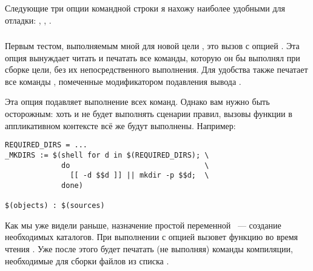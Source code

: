 Следующие три опции командной строки я нахожу наиболее удобными для
отладки: , , .

\subsubsection{}

Первым тестом, выполняемым мной для новой цели , это вызов
\GNUmake{} с опцией . Эта опция вынуждает
\GNUmake{} читать \Makefile{} и печатать все команды, которую он бы
выполнял при сборке цели, без их непосредственного выполнения. Для
удобства \GNUmake{} также печатает все команды ,
помеченные модификатором подавления вывода .

Эта опция подавляет выполнение всех команд. Однако вам нужно быть
осторожным: хоть \GNUmake{} и не будет выполнять сценарии правил,
вызовы функции  в аппликативном контексте всё же будут
выполнены. Например:

\begin{verbatim}
REQUIRED_DIRS = ...
_MKDIRS := $(shell for d in $(REQUIRED_DIRS); \
             do                               \
               [[ -d $$d ]] || mkdir -p $$d;  \
             done)

$(objects) : $(sources)
\end{verbatim}

Как мы уже видели раньше, назначение простой переменной
~--- создание необходимых каталогов. При выполнении
с опцией  \GNUmake{} вызовет функцию
\function{shell} во время чтения \makefile{а}. Уже после этого
\GNUmake{} будет печатать (не выполняя) команды компиляции,
необходимые для сборки файлов из списка \command{\$(objects)}.
